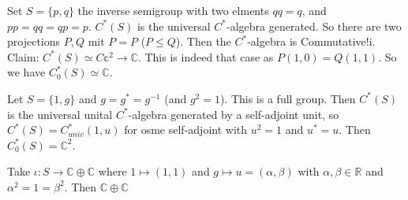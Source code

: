 \documentclass[a4paper]{article}
\begin{document}
\begin{example}
	Set $S = \{p,q\}$ the inverse semigroup with two elments $qq = q$, and $pp = qq = qp = p$.
	$C^*(S)$ is the universal $C^*$-algebra generated. So there are two projections $P,Q$ mit $P= P$ ($P \leq Q$). Then the $C^*$-algebra is Commutative!i.
	Claim: $C^*(S) \simeq C\mathds{c}^2 \to \mathds{C}$.
	This is indeed that case as $P(1,0) = Q(1,1)$.
	So we have $C_0^*(S) \simeq \mathds{C}$.
\end{example}

\begin{example}
	Let $S = \{1, g\}$ and $g = g^* = g^{-1}$ (and $g^2 = 1$).
	This is a full group.
	Then $C^*(S)$ is the universal unital $C^*$-algebra generated by a self-adjoint unit, so $C^*(S) = C^*_{univ} (1, u)$ for osme self-adjoint with $u^2 =1$ and $u^*=u$.
	Then $C^*_0(S) = \mathds{C}^2$.

	Take $\iota: S \to \mathds{C} \oplus \mathds{C}$ where $1 \mapsto (1,1)$ and $g \mapsto u = (\alpha, \beta)$ with $\alpha, \beta \in \mathds{R}$ and $\alpha^2 = 1 = \beta^2$.
	Then $\mathds{C} \oplus \mathds{C}$
\end{example}
\end{document}
